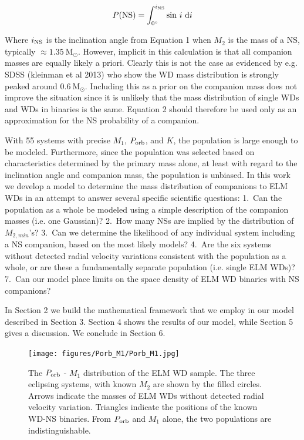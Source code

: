 \documentclass[letterpaper,12pt,preprint]{aastex}
\newcommand{\Msun}{\mathrm{M}_\odot}
\begin{document}
\begin{equation}
P({\rm NS}) = \int_{0^{\circ}}^{i_{\rm NS}} {\rm sin}\ i\ {\rm d}i
\end{equation}

Where $i_{\rm NS}$ is the inclination angle from Equation 1 when $M_2$ is the mass of a NS, typically $\approx1.35~\Msun$. However, implicit in this calculation is that all companion masses are equally likely a priori. Clearly this is not the case as evidenced by e.g. SDSS (kleinman et al 2013) who show the WD mass distribution is strongly peaked around $0.6~\Msun$. Including this as a prior on the companion mass does not improve the situation since it is unlikely that the mass distribution of single WDs and WDs in binaries is the same. Equation 2 should therefore be used only as an approximation for the NS probability of a companion.


With 55 systems with precise $M_1$, $P_{\rm orb}$, and $K$, the population is large enough to be modeled. Furthermore, since the population was selected based on characteristics determined by the primary mass alone, at least with regard to the inclination angle and companion mass, the population is unbiased. In this work we develop a model to determine the mass distribution of companions to ELM WDs in an attempt to answer several specific scientific questions: 1.\ Can the population as a whole be modeled using a simple description of the companion masses (i.e. one Gaussian)? 2.\ How many NSs are implied by the distribution of $M_{2,min}$'s? 3.\ Can we determine the likelihood of any individual system including a NS companion, based on the most likely models? 4.\ Are the six systems without detected radial velocity variations consistent with the population as a whole, or are these a fundamentally separate population (i.e. single ELM WDs)? 7.\ Can our model place limits on the space density of ELM WD binaries with NS companions? 


In Section 2 we build the mathematical framework that we employ in our model described in Section 3. Section 4 shows the results of our model, while Section 5 gives a discussion. We conclude in Section 6.

\begin{figure}[h!]
\begin{center}
\texttt{[image: figures/Porb\_M1/Porb\_M1.jpg]}
\caption{The $P_{\rm orb}$ - $M_1$ distribution of the ELM WD sample. The three eclipsing systems, with known $M_2$ are shown by the filled circles. Arrows indicate the masses of ELM WDs without detected radial velocity variation. Triangles indicate the positions of the known WD-NS binaries. From $P_{\rm orb}$ and $M_1$ alone, the two populations are indistinguishable.}
\end{center}
\end{figure}
\end{document}
